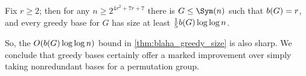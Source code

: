 


\begin{theorem}[Blaha, 1992]\label{thm:blaha_greedy_sharp}
    Fix $r \geq 2$; then for any $n \geq 2^{4r^2 + 7r + 7}$ there is $G \leq \Sym(n)$ such that $\added{2}{b(G)} = r$, and every greedy base for $G$ has size at least $\frac{1}{5}\added{2}{b(G)}\log\log n$.
\end{theorem}


So, the $O(\added{2}{b(G)}\log\log n)$ bound in \autoref{thm:blaha_greedy_size} is also sharp. We conclude that greedy bases certainly offer a marked improvement over simply taking nonredundant bases for a permutation group.